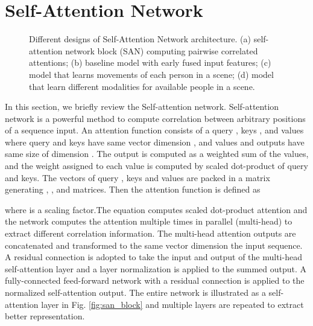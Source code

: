 \documentclass[10pt,twocolumn,letterpaper]{article}
\begin{document}
\section{Self-Attention Network}
\begin{figure*}[!t]
	\centering
	\hspace{0.4em}\hspace{0.6em}\hspace{0.6em}
\caption{
		Different designs of Self-Attention Network architecture. (a) self-attention network block (SAN) computing pairwise correlated attentions; (b) baseline model with early fused input features; (c) model that learns movements of each person in a scene; (d) model that learn different modalities for available people in a scene.
}
	\label{fig:SAN_design}
\end{figure*}

In this section, we briefly review the Self-attention network.
Self-attention network \cite{related_transformer} is a powerful method to compute correlation between arbitrary positions of a sequence input. 
An attention function consists of a query , keys , and values  where query and keys have same vector dimension , and values and outputs have same size of dimension . The output is computed as a weighted sum of the values, and the weight assigned to each value is computed by scaled dot-product of query and keys. 
The vectors of query , keys  and values  are packed in a matrix generating , , and  matrices. Then the attention function is defined as 

where  is a scaling factor.The equation computes scaled dot-product attention and the network computes the attention multiple times in parallel (multi-head) to extract different correlation information. The multi-head attention outputs are concatenated and transformed to the same vector dimension the input sequence. A residual connection is adopted to take the input and output of the multi-head self-attention layer and a layer normalization is applied to the summed output.
A fully-connected feed-forward network with a residual connection is applied to the normalized self-attention output. The entire network is illustrated as a self-attention layer in Fig. \ref{fig:san_block} and multiple layers are repeated to extract better representation.
\end{document}
